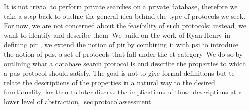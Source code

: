 It is not trivial to perform private searches on a private database, therefore we take a step back to outline the general idea behind the type of protocols we seek. For now, we are not concerned about the feasibility of such protocols; instead, we want to identify and describe them. We build on the work of Ryan Henry in defining \acrshort{pir} \cite{CCS:Henry17}, we extend the notion of \acrshort{pir} by combining it with \acrshort{psi} to introduce the notion of \acrshort{pds}, a set of protocols that fall under the \acrshort{ot} category. We do so by outlining what a database search protocol is and describe the properties to which a \acrshort{pds} protocol should satisfy. The goal is not to give formal definitions but to relate the descriptions of the properties in a natural way to the desired functionality, for then to later discuss the implications of those descriptions at a lower level of abstraction, \cref{sec:protocolassessment}.